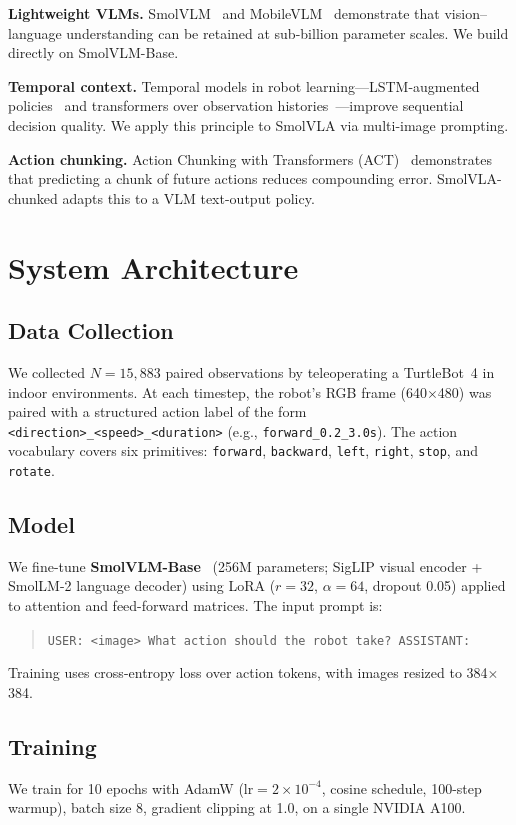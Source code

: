 \documentclass[conference]{IEEEtran}
\begin{document}
\textbf{Lightweight VLMs.}
SmolVLM~\cite{smolvlm} and MobileVLM~\cite{mobilevlm} demonstrate that vision--language
understanding can be retained at sub-billion parameter scales. We build directly on SmolVLM-Base.

\textbf{Temporal context.}
Temporal models in robot learning---LSTM-augmented policies~\cite{lstm_policy} and
transformers over observation histories~\cite{gato}---improve sequential decision quality.
We apply this principle to SmolVLA via multi-image prompting.

\textbf{Action chunking.}
Action Chunking with Transformers (ACT)~\cite{act} demonstrates that predicting a chunk of
future actions reduces compounding error. SmolVLA-chunked adapts this to a VLM text-output policy.

\section{System Architecture}
\label{sec:method}

\subsection{Data Collection}
We collected $N=15{,}883$ paired observations by teleoperating a TurtleBot~4 in indoor
environments. At each timestep, the robot's RGB frame (640$\times$480) was paired with a
structured action label of the form \texttt{<direction>\_<speed>\_<duration>}
(e.g., \texttt{forward\_0.2\_3.0s}). The action vocabulary covers six primitives:
\texttt{forward}, \texttt{backward}, \texttt{left}, \texttt{right}, \texttt{stop}, and
\texttt{rotate}.

\subsection{Model}
We fine-tune \textbf{SmolVLM-Base}~\cite{smolvlm} (256M parameters; SigLIP visual encoder +
SmolLM-2 language decoder) using LoRA ($r=32$, $\alpha=64$, dropout 0.05) applied to attention
and feed-forward matrices. The input prompt is:
\begin{quote}
\small\texttt{USER: <image> What action should the robot take? ASSISTANT:}
\end{quote}
Training uses cross-entropy loss over action tokens, with images resized to 384$\times$384.

\subsection{Training}
We train for 10 epochs with AdamW (lr$=2\times10^{-4}$, cosine schedule, 100-step warmup),
batch size 8, gradient clipping at 1.0, on a single NVIDIA A100.
\end{document}

